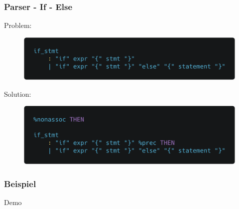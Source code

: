 \begin{frame}[fragile]
	\frametitle{Parser - If - Else}
	Problem:
	\begin{figure}[H]
		\centering
		\includegraphics[width=0.7\linewidth]{images/parser/if-else-grammar.png}
	\end{figure}
	\pause
	Solution:

	\begin{figure}[H]
		\centering
		\includegraphics[width=0.7\linewidth]{images/parser/sol-if-else-grammar.png}
	\end{figure}
\end{frame}

\begin{frame}[fragile]
	\frametitle{Beispiel}
	\begin{center}
		\Huge Demo
	\end{center}
\end{frame}

